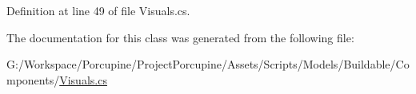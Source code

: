 Definition at line 49 of file Visuals.\+cs.



The documentation for this class was generated from the following file\+:\begin{DoxyCompactItemize}
\item 
G\+:/\+Workspace/\+Porcupine/\+Project\+Porcupine/\+Assets/\+Scripts/\+Models/\+Buildable/\+Components/\hyperlink{_visuals_8cs}{Visuals.\+cs}\end{DoxyCompactItemize}
